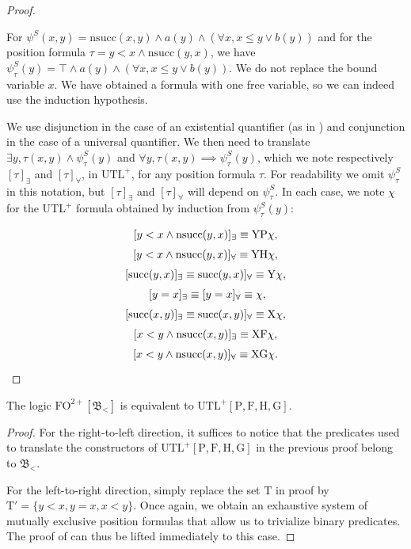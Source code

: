 \documentclass[a4paper,UKenglish,cleveref, autoref, thm-restate]{lipics-v2021}
\newcommand{\Tau}{\mathrm{T}}
\newcommand{\FO}{\mathrm{FO}}
\newcommand{\FOtwp}{\FO^{2+}}
\newcommand{\UTL}{\mathrm{UTL}}
\newcommand{\UTLp}{\UTL^+}
\newcommand{\X}{\mathrm{X}}
\newcommand{\Y}{\mathrm{Y}}
\renewcommand{\P}{\mathrm{P}}
\newcommand{\F}{\mathrm{F}}
\renewcommand{\H}{\mathrm{H}}
\newcommand{\G}{\mathrm{G}}
\renewcommand{\succ}{\mathrm{succ}}
\renewcommand{\nsucc}{\mathrm{nsucc}}
\newcommand{\bin}{\mathfrak{B}}
\begin{document}
\begin{proof}
    \begin{example}
        For $\psi^S(x,y) = \nsucc(x,y) \land a(y) \land (\forall x, x \leq y \lor b(y))$ and for the position formula $\tau = y<x \land \nsucc(y, x)$, we have $\psi_{\tau}^S(y) = \top \land a(y) \land (\forall x, x \leq y \lor b(y))$. We do not replace the bound variable $x$. We have obtained a formula with one free variable, so we can indeed use the induction hypothesis.
    \end{example}

    We use disjunction in the case of an existential quantifier (as in \cite{UTL}) and conjunction in the case of a universal quantifier.
    We then need to translate $\exists y, \tau(x,y) \land \psi_{\tau}^S(y)$ and $\forall y, \tau(x,y) \implies \psi_{\tau}^S(y)$, which we note respectively $[\tau]_{\exists}$ and $[\tau]_{\forall}$, in $\UTLp$, for any position formula $\tau$. For readability we omit $\psi_{\tau}^S$ in this notation, but $[\tau]_{\exists}$ and $[\tau]_{\forall}$ will depend on $\psi_{\tau}^S$.
    In each case, we note $\chi$ for the $\UTLp$ formula obtained by induction from $\psi_{\tau}^S(y)$:
    $$
    \def\arraystretch{1.5}
    \begin{array}{c}
    [y<x \land \nsucc(y,x)]_{\exists} \equiv \Y \P \chi,\\   
    ~[y<x \land \nsucc(y,x)]_{\forall} \equiv \Y \H \chi,~\\ 
    ~ [\succ(y,x)]_{\exists} \equiv \succ(y,x)]_{\forall} \equiv \Y \chi,~\\ 
     ~[y=x]_{\exists} \equiv [y=x]_{\forall} \equiv \chi,    \\ 
    ~[\succ(x,y)]_{\exists} \equiv \succ(x,y)]_{\forall} \equiv \X \chi,~\\ 
   ~[x < y \land \nsucc(x,y)]_{\exists} \equiv \X \F \chi,~\\ 
    ~[x < y \land \nsucc(x,y)]_{\forall} \equiv \X \G \chi.~
    \end{array}
  $$ 
\end{proof}





\begin{corollary} \label{coro:equiv2withoutX}
    The logic $\FOtwp[\bin_<]$ is equivalent to $\UTLp[\P,\F,\H,\G]$.
\end{corollary}

\begin{proof}
    For the right-to-left direction, it suffices to notice that the predicates used to translate the constructors of $\UTLp[\P,\F,\H,\G]$ in the previous proof belong to $\bin_<$.

    For the left-to-right direction, simply replace the set $\Tau$ in  proof by $\Tau' = \{ y<x, y=x, x<y \}$. Once again, we obtain an exhaustive system of mutually exclusive position formulas that allow us to trivialize binary predicates. The proof of  can thus be lifted immediately to this case.
\end{proof}
\end{document}
